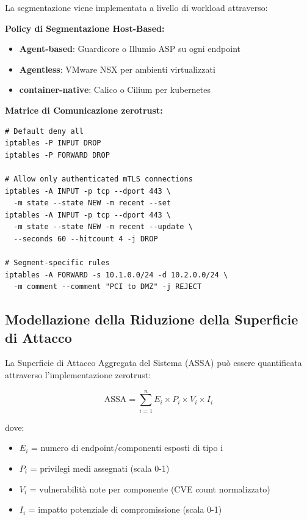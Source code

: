 La segmentazione viene implementata a livello di workload attraverso:

\textbf{Policy di Segmentazione Host-Based:}
\begin{itemize}
    \item \textbf{Agent-based}: Guardicore o Illumio ASP su ogni endpoint
    \item \textbf{Agentless}: VMware NSX per ambienti virtualizzati
    \item \textbf{\gls{container}-native}: Calico o Cilium per \gls{kubernetes}
\end{itemize}

\textbf{Matrice di Comunicazione \gls{zerotrust}:}
\begin{lstlisting}[caption={Regole iptables per micro-segmentazione},label={lst:iptables}]
# Default deny all
iptables -P INPUT DROP
iptables -P FORWARD DROP

# Allow only authenticated mTLS connections
iptables -A INPUT -p tcp --dport 443 \
  -m state --state NEW -m recent --set
iptables -A INPUT -p tcp --dport 443 \
  -m state --state NEW -m recent --update \
  --seconds 60 --hitcount 4 -j DROP

# Segment-specific rules
iptables -A FORWARD -s 10.1.0.0/24 -d 10.2.0.0/24 \
  -m comment --comment "PCI to DMZ" -j REJECT
\end{lstlisting}

\subsection{\texorpdfstring{Modellazione della Riduzione della Superficie di Attacco}{3.5.2 - Modellazione della Riduzione della Superficie di Attacco}}

La Superficie di Attacco Aggregata del Sistema (ASSA) può essere quantificata attraverso l'implementazione \gls{zerotrust}:

\begin{equation}
\text{ASSA} = \sum_{i=1}^{n} E_i \times P_i \times V_i \times I_i
\end{equation}

dove:
\begin{itemize}
    \item $E_i$ = numero di endpoint/componenti esposti di tipo i
    \item $P_i$ = privilegi medi assegnati (scala 0-1)
    \item $V_i$ = vulnerabilità note per componente (CVE count normalizzato)
    \item $I_i$ = impatto potenziale di compromissione (scala 0-1)
\end{itemize}

